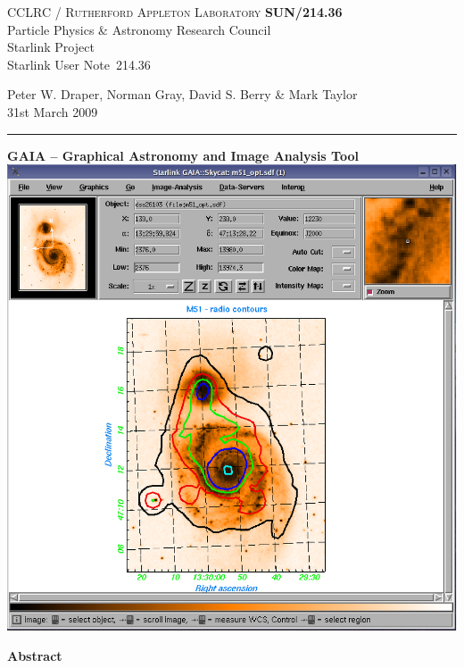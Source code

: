 \documentclass[twoside,11pt]{article}
\newcommand{\stardoccategory}  {Starlink User Note}
\newcommand{\stardocinitials}  {SUN}
\newcommand{\stardocnumber}    {214.36}
\newcommand{\stardocauthors}   {Peter W. Draper, 
                                Norman Gray, 
                                David S. Berry \& 
                                Mark Taylor }
\newcommand{\stardocdate}      {31st March 2009}
\newcommand{\stardoctitle}     {GAIA -- 
                                Graphical Astronomy and Image Analysis Tool}
\newcommand{\stardocname}{\stardocinitials /\stardocnumber}
\newenvironment{latexonly}{}{}
\renewcommand{\_}{\texttt{\symbol{95}}}
\begin{document}
\thispagestyle{empty}

\begin{latexonly}
   CCLRC / \textsc{Rutherford Appleton Laboratory} \hfill \textbf{\stardocname}\\
   {\large Particle Physics \& Astronomy Research Council}\\
   {\large Starlink Project\\}
   {\large \stardoccategory\ \stardocnumber}
   \begin{flushright}
   \stardocauthors\\
   \stardocdate
   \end{flushright}
   \vspace{-4mm}
   \rule{\textwidth}{0.5mm}
   \vspace{5mm}
   \begin{center}
   {\Large\textbf{\stardoctitle \\ [2.5ex]}}
   \vspace{5mm}
   \includegraphics[totalheight=5in]{sun214fig.ps}
   \end{center}

   \begin{center}
      {\Large\textbf{Abstract}}
   \end{center}
\end{latexonly}
\end{document}
